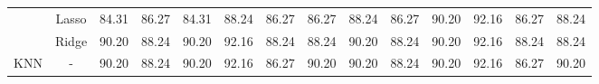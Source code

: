 \begin{landscape}
\begin{table}[]
{\begin{tabular}{cc|clllllclllll}
                                & Lasso                                 & 84.31                                                             & 86.27                                                                & 84.31                                                                & 88.24                                                               & 86.27                                                            & \multicolumn{1}{c|}{86.27}                                                                   & 88.24                                                             & 86.27                                                                & 90.20                                                                & 92.16                                                               & 86.27                                                            & 88.24                                                                   \\ 
                                 & Ridge                                 & 90.20                                                             & 88.24                                                                & 90.20                                                                & 92.16                                                               & 88.24                                                            & \multicolumn{1}{c|}{88.24}                                                                   & 90.20                                                             & 88.24                                                                & 90.20                                                                & 92.16                                                               & 88.24                                                            & 88.24                                                                   \\ \hline
KNN                             & -                                     & 90.20                                                             & 88.24                                                                & 90.20                                                                & 92.16                                                               & 86.27                                                            & \multicolumn{1}{c|}{90.20}                                                                   & 90.20                                                             & 88.24                                                                & 90.20                                                                & 92.16                                                               & 86.27                                                            & 90.20                                                                   \\ \hline

\end{tabular}}
\end{table}
\end{landscape}
